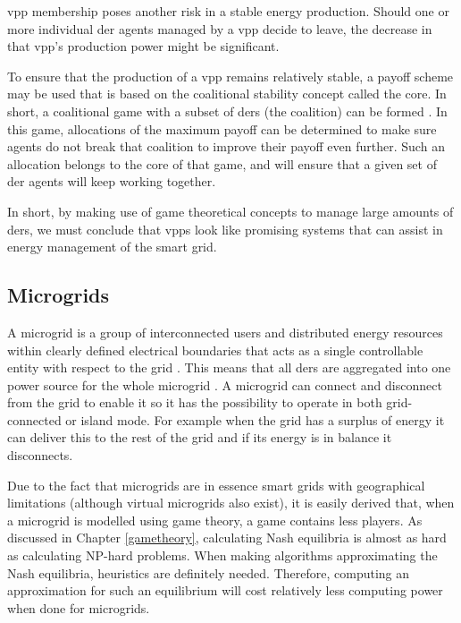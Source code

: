 \ac{vpp} membership poses another risk in a stable energy production. Should one or more individual \ac{der} agents managed by a \ac{vpp} decide to leave, the decrease in that \ac{vpp}'s production power might be significant. 

To ensure that the production of a \ac{vpp} remains relatively stable, a payoff scheme may be used that is based on the coalitional stability concept called the core. In short, a coalitional game with a subset of \acp{der} (the coalition) can be formed \cite{MihailescuVasiraniOssowski2011}. In this game, allocations of the maximum payoff can be determined to make sure agents do not break that coalition to improve their payoff even further\cite{ChalkiadakisRobuKotaEtAl2011, YeungPoonWu1999, SaadHanPoor2011}. Such an allocation belongs to the core of that game, and will ensure that a given set of \ac{der} agents will keep working together.

In short, by making use of game theoretical concepts to manage large amounts of \acp{der}, we must conclude that \acp{vpp} look like promising systems that can assist in energy management of the smart grid. 

\subsection{Microgrids}\label{microgrids}
A microgrid is a group of interconnected users and distributed energy resources within clearly defined electrical boundaries that acts as a single controllable entity with respect to the grid \cite{ParhiziLotfiKhodaeiEtAl2015}. This means that all \acp{der} are aggregated into one power source for the whole microgrid \cite{KanchevLuColasEtAl2011}. A microgrid can connect and disconnect from the grid to enable it so it has the possibility to operate in both grid-connected or island mode. For example when the grid has a surplus of energy it can deliver this to the rest of the grid and if its energy is in balance it disconnects. 

Due to the fact that microgrids are in essence smart grids with geographical limitations (although virtual microgrids also exist), it is easily derived that, when a microgrid is modelled using game theory, a game contains less players. As discussed in Chapter \ref{gametheory}, calculating Nash equilibria is almost as hard as calculating NP-hard problems. When making algorithms approximating the Nash equilibria, heuristics are definitely needed. Therefore, computing an approximation for such an equilibrium will cost relatively less computing power when done for microgrids. 

